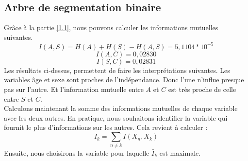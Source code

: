 \documentclass{article}
\begin{document}
\subsection{Arbre de segmentation binaire}
Grâce à la partie \ref{1.1}, nous pouvons calculer les informations mutuelles suivantes.
\[
I(A,S) = H(A) + H(S) - H(A,S) = 5,1104*10^{-5}
\]
\[
I(A,C) = 0,02830
\]
\[
I(S,C)= 0,02831
\]
Les résultats ci-dessus, permettent de faire les interprétations suivantes. Les variables âge et sexe sont proches de l'indépendance. Donc l'une n'influe presque pas sur l'autre. Et l'information mutuelle entre $A$ et $C$ est très proche de celle entre $S$ et $C$.
\\
Calculons maintenant la somme des informations mutuelles de chaque variable avec les deux autres. En pratique, nous souhaitons identifier la variable qui fournit le plus d'informations sur les autres. Cela revient à calculer :
\begin{equation}
    \bar{I}_k = \sum_{n \neq k} I(X_n, X_k)
    \label{eq : I bar}
\end{equation}
Ensuite, nous choisirons la variable pour laquelle \( \bar{I}_k \) est maximale.
\end{document}
